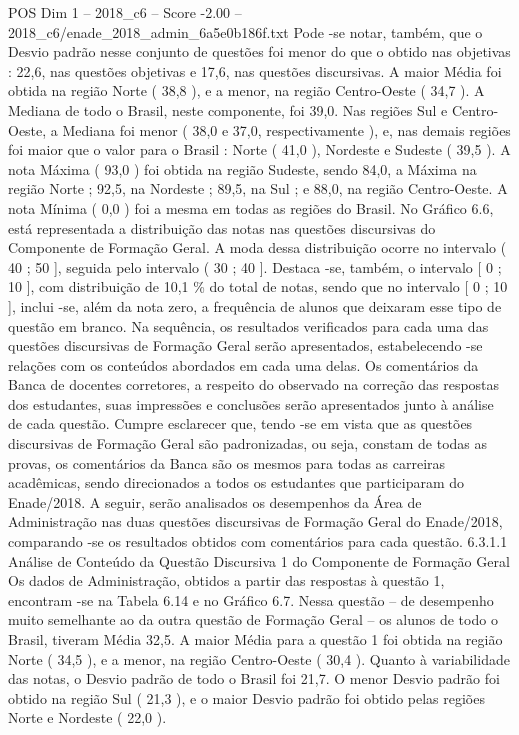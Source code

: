 \begin{textsample}{POS Dim 1 – 2018\_c6 – Score -2.00 – 2018\_c6/enade\_2018\_admin\_6a5e0b186f.txt}
Pode -se notar, também, que o Desvio padrão nesse conjunto de questões foi menor do que o obtido nas objetivas : 22,6, nas questões objetivas e 17,6, nas questões discursivas.
A maior Média foi obtida na região Norte ( 38,8 ), e a menor, na região Centro-Oeste ( 34,7 ).
A Mediana de todo o Brasil, neste componente, foi 39,0.
Nas regiões Sul e Centro-Oeste, a Mediana foi menor ( 38,0 e 37,0, respectivamente ), e, nas demais regiões foi maior que o valor para o Brasil : Norte ( 41,0 ), Nordeste e Sudeste ( 39,5 ).
A nota Máxima ( 93,0 ) foi obtida na região Sudeste, sendo 84,0, a Máxima na região Norte ; 92,5, na Nordeste ; 89,5, na Sul ; e 88,0, na região Centro-Oeste.
A nota Mínima ( 0,0 ) foi a mesma em todas as regiões do Brasil.
No Gráfico 6.6, está representada a distribuição das notas nas questões discursivas do Componente de Formação Geral.
A moda dessa distribuição ocorre no intervalo ( 40 ; 50 ], seguida pelo intervalo ( 30 ; 40 ].
Destaca -se, também, o intervalo [ 0 ; 10 ], com distribuição de 10,1 \% do total de notas, sendo que no intervalo [ 0 ; 10 ], inclui -se, além da nota zero, a frequência de alunos que deixaram esse tipo de questão em branco.
Na sequência, os resultados verificados para cada uma das questões discursivas de Formação Geral serão apresentados, estabelecendo -se relações com os conteúdos abordados em cada uma delas.
Os comentários da Banca de docentes corretores, a respeito do observado na correção das respostas dos estudantes, suas impressões e conclusões serão apresentados junto à análise de cada questão.
Cumpre esclarecer que, tendo -se em vista que as questões discursivas de Formação Geral são padronizadas, ou seja, constam de todas as provas, os comentários da Banca são os mesmos para todas as carreiras acadêmicas, sendo direcionados a todos os estudantes que participaram do Enade/2018.
A seguir, serão analisados os desempenhos da Área de Administração nas duas questões discursivas de Formação Geral do Enade/2018, comparando -se os resultados obtidos com comentários para cada questão. 6.3.1.1 Análise de Conteúdo da Questão Discursiva 1 do Componente de Formação Geral Os dados de Administração, obtidos a partir das respostas à questão 1, encontram -se na Tabela 6.14 e no Gráfico 6.7.
Nessa questão – de desempenho muito semelhante ao da outra questão de Formação Geral – os alunos de todo o Brasil, tiveram Média 32,5.
A maior Média para a questão 1 foi obtida na região Norte ( 34,5 ), e a menor, na região Centro-Oeste ( 30,4 ).
Quanto à variabilidade das notas, o Desvio padrão de todo o Brasil foi 21,7.
O menor Desvio padrão foi obtido na região Sul ( 21,3 ), e o maior Desvio padrão foi obtido pelas regiões Norte e Nordeste ( 22,0 ).

\end{textsample}
